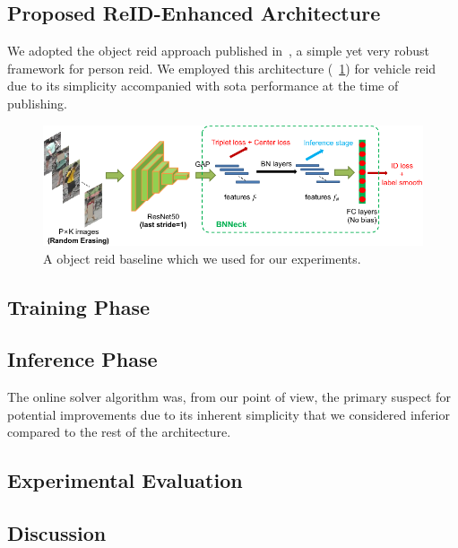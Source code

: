 \subsection{Proposed ReID-Enhanced Architecture}
\label{ssec:ProposedReIDEnhancedArchitecture}

We adopted the object \gls{reid} approach published in~\cite{luo2019bagoftricksreid}, a simple yet very robust framework for person \gls{reid}. We employed this architecture (\figtext{}~\ref{fig:BagOfTricksReIDArchitecture}) for vehicle \gls{reid} due to its simplicity accompanied with \gls{sota} performance at the time of publishing.

\begin{figure}[!t]
    \centering
    \includegraphics[width=\linewidth]{figures/siamese_tracking/bagoftricks_reid_architecture.pdf}
    \caption[Gls{reid} baseline]{A object \gls{reid} baseline which we used for our experiments. }
    \label{fig:BagOfTricksReIDArchitecture}
\end{figure}

\subsection{Training Phase}

\subsection{Inference Phase}

The online solver algorithm was, from our point of view, the primary suspect for potential improvements due to its inherent simplicity that we considered inferior compared to the rest of the architecture.

\subsection{Experimental Evaluation}

\subsection{Discussion}